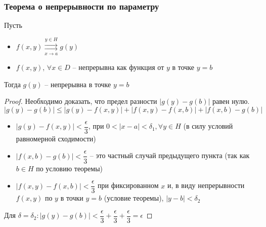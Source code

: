 \subsubsection{Теорема о непрерывности по параметру}
\begin{theorem*}
    Пусть
    \begin{itemize}
        \item $f(x, y) \overset{y \in H}{\underset{x \to a}{\rightrightarrows}} g(y)$
        \item $f(x, y)$, $\forall x \in D$ -- непрерывна как функция от $y$ в точке $y = b$
    \end{itemize}
    Тогда $g(y)$ -- непрерывна в точке $y = b$
\end{theorem*}
\begin{proof}
    Необходимо доказать, что предел разности $|g(y) - g(b)|$ равен нулю. \\ 
    $|g(y) - g(b)| \leqslant |g(y) - f(x, y)| + |f(x, y) - f(x, b)| + |f(x, b) - g(b)|$
    \begin{itemize}
        \item $|g(y) - f(x, y)| < \dfrac{\epsilon}{3}$, при $0 < |x - a| < \delta_1, \forall y \in H$ 
        (в силу условий равномерной сходимости)
        \item $|f(x, b) - g(b)| < \dfrac{\epsilon}{3}$ -- это частный случай предыдущего 
        пункта (так как $b \in H$ по условию теоремы)
        \item $|f(x, y) - f(x, b)| < \dfrac{\epsilon}{3}$ при фиксированном $x$ и, в виду непрерывности
        $f(x, y)$ по $y$ в точки $y = b$ (условие теоремы), $|y - b| < \delta_2$
    \end{itemize}
    Для $\delta = \delta_2: |g(y) - g(b)| < \dfrac{\epsilon}{3} + 
    \dfrac{\epsilon}{3} +  \dfrac{\epsilon}{3} = \epsilon$
\end{proof}

